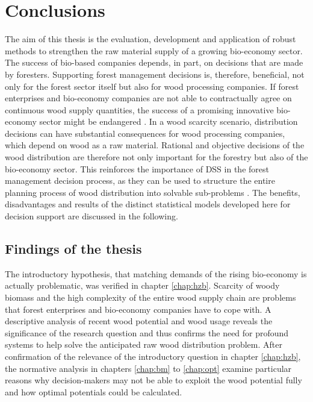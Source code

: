 \chapter{Conclusions}
\label{chap:discussion}
\newpage
\noindent
The aim of this thesis is the evaluation, development and application of robust methods to strengthen the raw material supply of a growing bio-economy sector. The success of bio-based companies depends, in part, on decisions that are made by foresters. Supporting forest management decisions is, therefore, beneficial, not only for the forest sector itself but also for wood processing companies. If forest enterprises and bio-economy companies are not able to contractually agree on continuous wood supply quantities, the success of a promising innovative bio-economy sector might be endangered \citep[p. 221, 223]{elchichakli_2016}. In a wood scarcity scenario, distribution decisions can have substantial consequences for wood processing companies, which depend on wood as a raw material. Rational and objective decisions of the wood distribution are therefore not only important for the forestry but also of the bio-economy sector. This reinforces the importance of DSS in the forest management decision process, as they can be used to structure the entire planning process of wood distribution into solvable sub-problems \citep[p. 1065-1067]{pretzsch_2008}. The benefits, disadvantages and results of the distinct statistical models developed here for decision support are discussed in the following.

\section{Findings of the thesis}
\label{sec:discussion:findings}
The introductory hypothesis, that matching demands of the rising bio-economy is actually problematic, was verified in chapter \ref{chap:hzb}. Scarcity of woody biomass and the high complexity of the entire wood supply chain are problems that forest enterprises and bio-economy companies have to cope with. A descriptive analysis of recent wood potential and wood usage reveals the significance of the research question and thus confirms the need for profound systems to help solve the anticipated raw wood distribution problem. After confirmation of the relevance of the introductory question in chapter \ref{chap:hzb}, the normative analysis in chapters \ref{chap:bm} to \ref{chap:opt} examine particular reasons why decision-makers may not be able to exploit the wood potential fully and how optimal potentials could be calculated.

